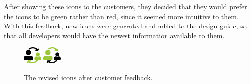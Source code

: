 After showing these icons to the customers, they decided that they would prefer the icons to be green rather than red, since it seemed more intuitive to them.
With this feedback, new icons were generated and added to the design guide, so that all developers would have the newest information available to them.

\begin{figure}[htp]

    \centering
    \includegraphics[width=.1\textwidth]{figures/changeToGuardianGreen}\hfill
    \includegraphics[width=.1\textwidth]{figures/changeToCitizenGreen}
    
    \caption{The revised icons after customer feedback.}
    \label{fig:change-profile-icons-green}
\end{figure}
